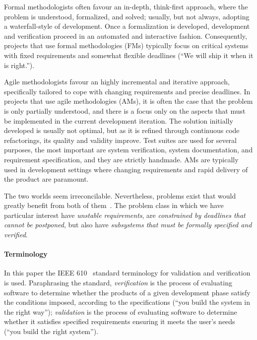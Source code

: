 \documentclass[english]{lni}
\begin{document}
Formal methodologists often favour an in-depth, think-first approach, where the problem is understood, formalized, and solved; usually, but not always, adopting a waterfall-style of development.  
Once a formalization is developed, development and verification proceed in an automated and interactive fashion.  
Consequently, projects that use formal methodologies (FMs) typically focus on critical systems with fixed requirements and somewhat flexible deadlines (``We will ship it when it is right.'').

Agile methodologists favour an highly incremental and iterative approach, specifically tailored to cope with changing requirements and precise deadlines.  
In projects that use agile methodologies (AMs), it is often the case that the problem is only partially understood, and there is a focus only on the aspects that must be implemented in the current development iteration.  
The solution initially developed is usually not optimal, but as it is refined through continuous code refactorings, its quality and validity improve.  
Test suites are used for several purposes, the most important are system verification, system documentation, and requirement specification, and they are strictly handmade.  
AMs are typically used in development settings where changing requirements and rapid delivery of the product are paramount.

The two worlds seem irreconcilable.  
Nevertheless, problems exist that would greatly benefit from both of them~\cite{Black2009}.  
The problem class in which we have particular interest have \emph{unstable requirements}, are \emph{constrained by deadlines that cannot be postponed}, but also have \emph{subsystems that must be formally specified and verified}.


\paragraph*{Terminology}

In this paper the IEEE 610~\cite{Jay1990} standard terminology for validation and verification is used.  
Paraphrasing the standard, \emph{verification} is the process of evaluating software to determine whether the products of a given development phase satisfy the conditions imposed, according to the specifications (``you build the system in the right way''); \emph{validation} is the process of evaluating software to determine whether it satisfies specified requirements ensuring it meets the user's needs (``you build the right system'').
\end{document}
